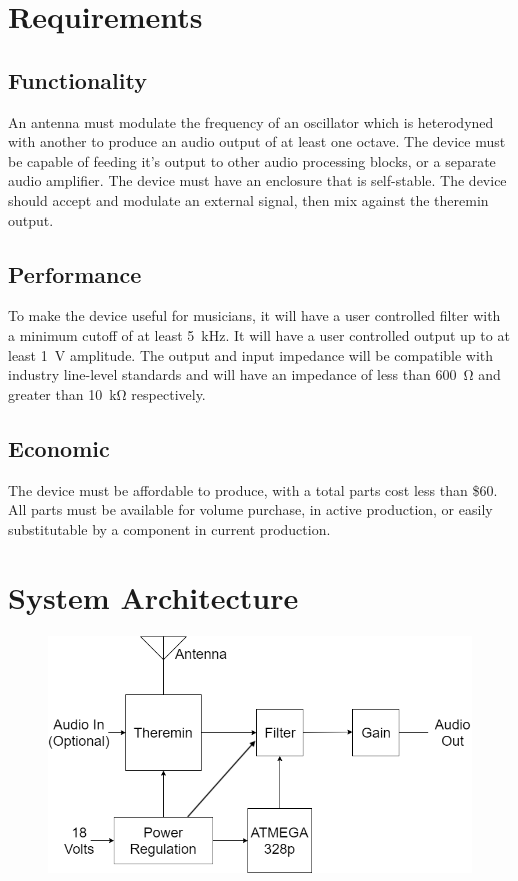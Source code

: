 \documentclass[11pt]{report}
\begin{document}
	\section*{Requirements}
	\subsection*{Functionality}
	An antenna must modulate the frequency of an oscillator which is heterodyned with another to produce an audio output of at least one octave. The device must be capable of feeding it's output to other audio processing blocks, or a separate audio amplifier. The device must have an enclosure that is self-stable. The device should accept and modulate an external signal, then mix against the theremin output.
	\subsection*{Performance}
		To make the device useful for musicians, it will have a user controlled filter with a minimum cutoff of at least \SI{5}{\kilo\hertz}. It will have a user controlled output up to at least \SI{1}{\volt} amplitude. The output and input impedance will be compatible with industry line-level standards and will have an impedance of less than \SI{600}{\ohm} and greater than \SI{10}{\kilo\ohm} respectively. 
	\subsection*{Economic}
	The device must be affordable to produce, with a total parts cost less than \$60. All parts must be available for volume purchase, in active production, or easily substitutable by a component in current production. 
\section*{System Architecture}
	\begin{figure}[H]
\includegraphics[width = \textwidth]{Theremizer_HighLevel_BD.png}
	\end{figure}
\end{document}

